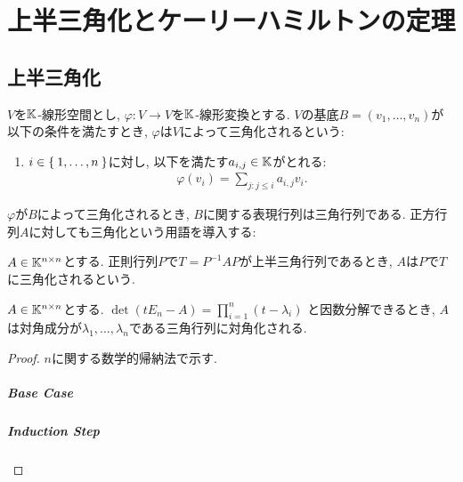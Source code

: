 \begin{quiz}
\end{quiz}

\chapter{上半三角化とケーリーハミルトンの定理}

\section{上半三角化}

\begin{definition}
$V$を$\mathbb{K}$-線形空間とし,
$\varphi\colon V\to V$を$\mathbb{K}$-線形変換とする.
$V$の基底$B=(v_1,\ldots,v_n)$が以下の条件を満たすとき,
$\varphi$は$V$によって三角化されるという:
\begin{enumerate}
\item
$i\in\Set{1,\ldots,n}$に対し,
以下を満たす$a_{i,j}\in\mathbb{K}$がとれる:
\begin{align*}
\varphi(v_i)=\sum_{j\colon j\leq i }a_{i,j}v_i.
\end{align*}
\end{enumerate}
\end{definition}
$\varphi$が$B$によって三角化されるとき,
$B$に関する表現行列は三角行列である.
正方行列$A$に対しても三角化という用語を導入する:
\begin{definition}
$A\in \mathbb{K}^{n\times n}$とする.
正則行列$P$で$T=P^{-1}AP$が上半三角行列であるとき,
$A$は$P$で$T$に三角化されるという.
\end{definition}

\begin{prop}
$A\in \mathbb{K}^{n\times n}$とする.
$\det(tE_n-A)=\prod_{i=1}^n (t-\lambda_i)$
と因数分解できるとき,
$A$は対角成分が$\lambda_1,\ldots,\lambda_n$である三角行列に対角化される.
\end{prop}
\begin{proof}
$n$に関する数学的帰納法で示す.
\paragraph{Base Case}
\paragraph{Induction Step}
\end{proof}

